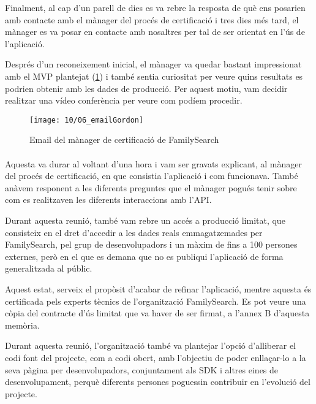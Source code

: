     Finalment, al cap d’un parell de dies es va rebre la resposta de què ens posarien amb contacte amb el mànager del procés de certificació i tres dies més tard, el mànager es va posar en contacte amb nosaltres per tal de ser orientat en l’ús de l’aplicació.

    Després d’un reconeixement inicial, el mànager va quedar bastant impressionat amb el MVP plantejat (\ref{fig:gordonEmail}) i també sentia curiositat per veure quins resultats es podrien obtenir amb les dades de producció. Per aquest motiu, vam decidir realitzar una vídeo conferència per veure com podíem procedir.

    \begin{figure}[h]
        \texttt{[image: 10/06\_emailGordon]}
        \centering
        \caption{Email del mànager de certificació de FamilySearch}\label{fig:gordonEmail}
    \end{figure}

    \paragraph{}
    Aquesta va durar al voltant d’una hora i vam ser gravats explicant, al mànager del procés de certificació, en que consistia l’aplicació i com funcionava. També anàvem responent a les diferents preguntes que el mànager pogués tenir sobre com es realitzaven les diferents interaccions amb l’API.

    Durant aquesta reunió, també vam rebre un accés a producció limitat, que consisteix en el dret d’accedir a les dades reals emmagatzemades per FamilySearch, pel grup de desenvolupadors i un màxim de fins a 100 persones externes, però en el que es demana que no es publiqui l’aplicació de forma generalitzada al públic.

    Aquest estat, serveix el propòsit d’acabar de refinar l’aplicació, mentre aquesta és certificada pels experts tècnics de l’organització FamilySearch. Es pot veure una còpia del contracte d’ús limitat que va haver de ser firmat, a l’annex B d'aquesta memòria.

    Durant aquesta reunió, l’organització també va plantejar l’opció d’alliberar el codi font del projecte, com a codi obert, amb l’objectiu de poder enllaçar-lo a la seva pàgina per desenvolupadors, conjuntament als SDK i altres eines de desenvolupament, perquè diferents persones poguessin contribuir en l’evolució del projecte.
